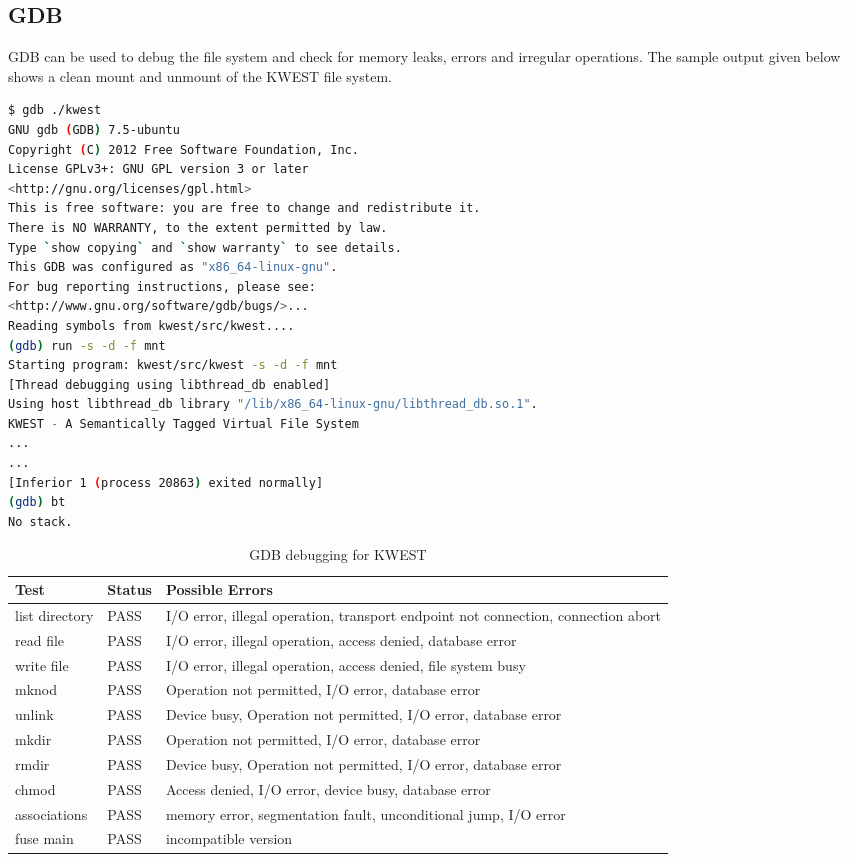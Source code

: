 \subsection*{GDB}
GDB can be used to debug the file system and check for memory leaks, errors and irregular operations. The sample output given below shows a clean mount and unmount of the KWEST file system.
\begin{lstlisting}[language=bash,frame=single]
$ gdb ./kwest
GNU gdb (GDB) 7.5-ubuntu
Copyright (C) 2012 Free Software Foundation, Inc.
License GPLv3+: GNU GPL version 3 or later 
<http://gnu.org/licenses/gpl.html>
This is free software: you are free to change and redistribute it.
There is NO WARRANTY, to the extent permitted by law.  
Type `show copying` and `show warranty` to see details.
This GDB was configured as "x86_64-linux-gnu".
For bug reporting instructions, please see:
<http://www.gnu.org/software/gdb/bugs/>...
Reading symbols from kwest/src/kwest....
(gdb) run -s -d -f mnt
Starting program: kwest/src/kwest -s -d -f mnt
[Thread debugging using libthread_db enabled]
Using host libthread_db library "/lib/x86_64-linux-gnu/libthread_db.so.1".
KWEST - A Semantically Tagged Virtual File System
...
...
[Inferior 1 (process 20863) exited normally]
(gdb) bt
No stack.
\end{lstlisting}

\begin{table}[h]
\begin{tabular}{|p{3cm}|p{2cm}|p{8cm}|}
\hline
\textbf{Test} & \textbf{Status} & \textbf{Possible Errors} \\ \hline
list directory	&	PASS &  I/O error, illegal operation, transport endpoint not connection, connection abort \\ \hline
read file & PASS & I/O error, illegal operation, access denied, database error \\ \hline
write file & PASS & I/O error, illegal operation, access denied, file system busy \\ \hline
mknod & PASS & Operation not permitted, I/O error, database error \\ \hline
unlink & PASS & Device busy, Operation not permitted, I/O error, database error \\ \hline
mkdir & PASS & Operation not permitted, I/O error, database error \\ \hline
rmdir & PASS & Device busy, Operation not permitted, I/O error, database error \\ \hline
chmod & PASS & Access denied, I/O error, device busy, database error \\ \hline
associations & PASS & memory error, segmentation fault, unconditional jump, I/O error \\ \hline
fuse main & PASS & incompatible version \\
\hline
\end{tabular}
\caption{GDB debugging for KWEST}
\label{tab:GDB}
\end{table}
